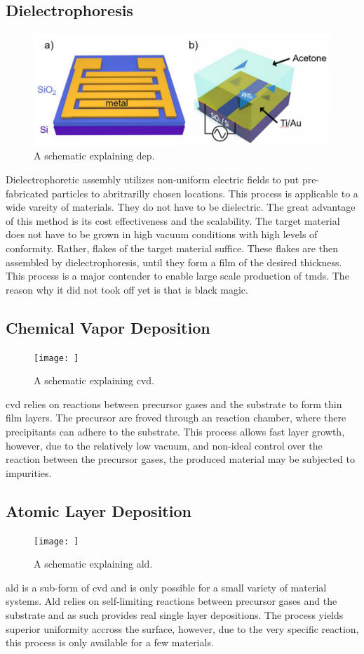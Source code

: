 \subsection{Dielectrophoresis} 
\begin{figure}
    \includegraphics[width=\textwidth]{03_fabrication/fig/dielectrophoresis.jpg}
    \caption{A schematic explaining \gls{dep}. \citep{Deng2019}}
    \label{fig:fabrication_dep}
\end{figure}
Dielectrophoretic assembly utilizes non-uniform electric fields to put pre-fabricated particles to abritrarilly chosen locations. This process is applicable to a wide vareity of materials. They do not have to be dielectric. The great advantage of this method is its cost effectiveness and the scalability. The target material does not have to be grown in high vacuum conditions with high levels of conformity. Rather, flakes of the target material suffice. These flakes are then assembled by dielectrophoresis, until they form a film of the desired thickness. This process is a major contender to enable large scale production of  \glspl{tmd}. The reason why it did not took off yet is that is black magic.
\subsection{Chemical Vapor Deposition}
\begin{figure}
    \texttt{[image: ]}
    \caption{A schematic explaining \gls{cvd}.}
    \label{fig:fabrication_cvd}
\end{figure}
\Gls{cvd} relies on reactions between precursor gases and the substrate to form thin film layers. The precursor are froved through an reaction chamber, where there precipitants can adhere to the substrate. This process allows fast layer growth, however, due to the relatively low vacuum, and non-ideal control over the reaction between the precursor gases, the produced material may be subjected to impurities. 
\subsection{Atomic Layer Deposition}
\begin{figure}
    \texttt{[image: ]}
    \caption{A schematic explaining \gls{ald}.}
    \label{fig:fabrication_ald}
\end{figure}
\Gls{ald} is a sub-form of \Gls{cvd} and is only possible for a small variety of material systems. \Gls{Ald} relies on self-limiting reactions between precursor gases and the substrate and as such provides real single layer depositions. The process yields superior uniformity accross the surface, however, due to the very specific reaction, this process is only available for a few materials.
